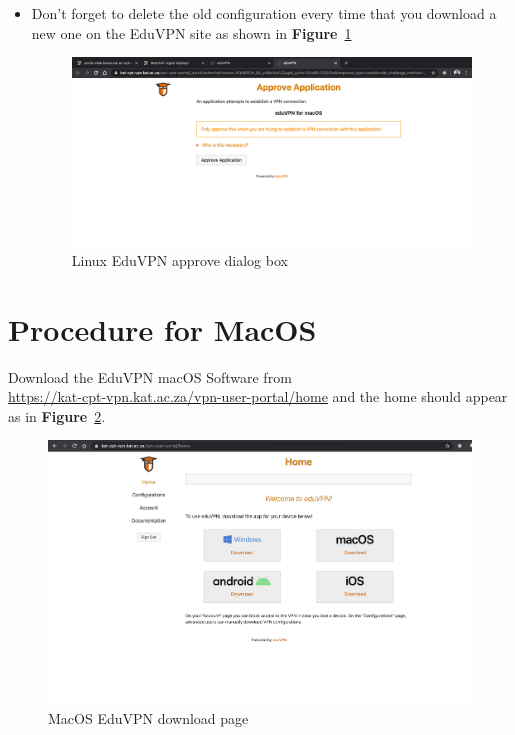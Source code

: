 \begin{itemize}
\item Don’t forget to delete the old configuration every time that you download a new one on the EduVPN site as shown in \textbf{Figure}~\ref{fig:image26}
\begin{figure}[!thb]
	\centering
	\includegraphics[scale=0.25]{Chapters/images/image26.png}
	
	\caption{Linux EduVPN approve dialog box }
	\label{fig:image26}
\end{figure}

\end{itemize}


\section{Procedure for MacOS}
Download the EduVPN macOS Software from\\ \url{https://kat-cpt-vpn.kat.ac.za/vpn-user-portal/home} and the home should appear as in  \textbf{Figure}~\ref{fig:image106}.

\begin{figure}[!thb]
	\centering
	\includegraphics[scale=0.23]{Chapters/images/image106.png}
	
	\caption{MacOS EduVPN download page }
	\label{fig:image106}
\end{figure}


